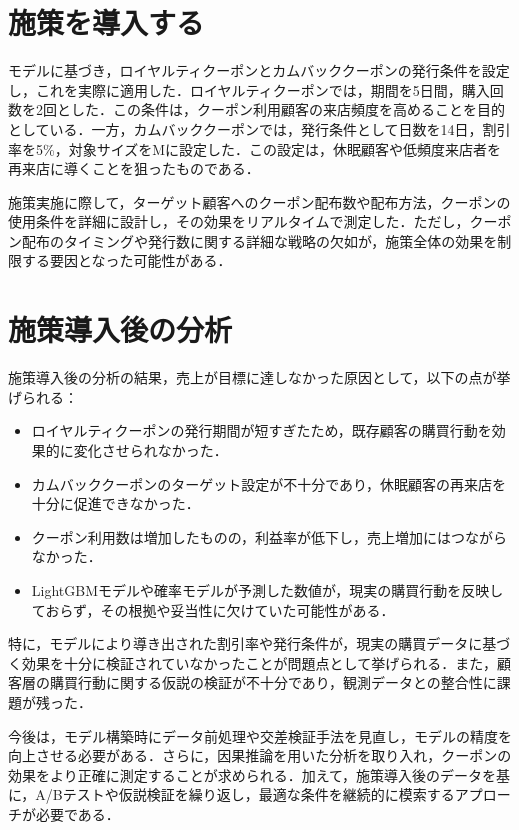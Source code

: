 \documentclass[titlepage,a4paper]{jsarticle}
\begin{document}
\section{施策を導入する}

モデルに基づき，ロイヤルティクーポンとカムバッククーポンの発行条件を設定し，これを実際に適用した．ロイヤルティクーポンでは，期間を5日間，購入回数を2回とした．この条件は，クーポン利用顧客の来店頻度を高めることを目的としている．一方，カムバッククーポンでは，発行条件として日数を14日，割引率を5\%，対象サイズをMに設定した．この設定は，休眠顧客や低頻度来店者を再来店に導くことを狙ったものである．

施策実施に際して，ターゲット顧客へのクーポン配布数や配布方法，クーポンの使用条件を詳細に設計し，その効果をリアルタイムで測定した．ただし，クーポン配布のタイミングや発行数に関する詳細な戦略の欠如が，施策全体の効果を制限する要因となった可能性がある．

\section{施策導入後の分析}

施策導入後の分析の結果，売上が目標に達しなかった原因として，以下の点が挙げられる：
\begin{itemize}
  \item ロイヤルティクーポンの発行期間が短すぎたため，既存顧客の購買行動を効果的に変化させられなかった．
  \item カムバッククーポンのターゲット設定が不十分であり，休眠顧客の再来店を十分に促進できなかった．
  \item クーポン利用数は増加したものの，利益率が低下し，売上増加にはつながらなかった．
  \item LightGBMモデルや確率モデルが予測した数値が，現実の購買行動を反映しておらず，その根拠や妥当性に欠けていた可能性がある．
\end{itemize}

特に，モデルにより導き出された割引率や発行条件が，現実の購買データに基づく効果を十分に検証されていなかったことが問題点として挙げられる．また，顧客層の購買行動に関する仮説の検証が不十分であり，観測データとの整合性に課題が残った．

今後は，モデル構築時にデータ前処理や交差検証手法を見直し，モデルの精度を向上させる必要がある．さらに，因果推論を用いた分析を取り入れ，クーポンの効果をより正確に測定することが求められる．加えて，施策導入後のデータを基に，A/Bテストや仮説検証を繰り返し，最適な条件を継続的に模索するアプローチが必要である．
\end{document}
